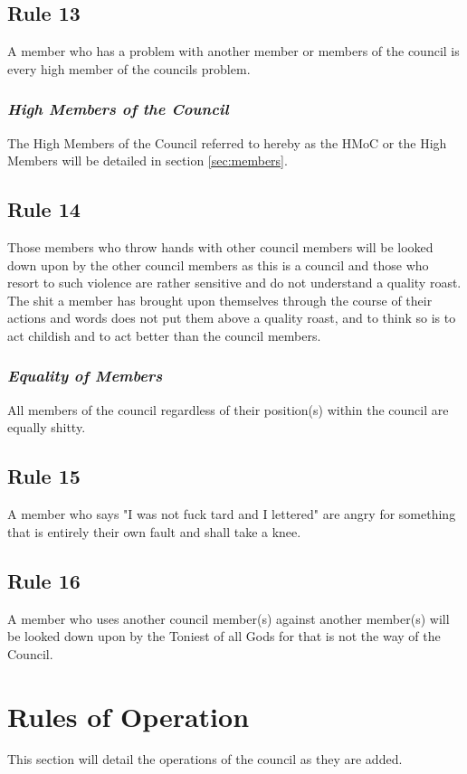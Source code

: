 \documentclass[letterpaper]{article}
\begin{document}
\subsection{Rule 13}
A member who has a problem with another member or members of the council is every high member of the councils problem.
\subsubsection{\textit{High Members of the Council}}
The High Members of the Council referred to hereby as the HMoC or the High Members will be detailed in section \ref{sec:members}.

\subsection{Rule 14}
Those members who throw hands with other council members will be looked down upon by the other council members as this is a council and those who resort to such violence are rather sensitive and do not understand a quality roast. The shit a member has brought upon themselves through the course of their actions and words does not put them above a quality roast, and to think so is to act childish and to act better than the council members.
\subsubsection{\textit{Equality of Members}}
All members of the council regardless of their position(s) within the council are equally shitty. 

\subsection{Rule 15}
A member who says "I was not fuck tard and I lettered" are angry for something that is entirely their own fault and shall take a knee.

\subsection{Rule 16}
A member who uses another council member(s) against another member(s) will be looked down upon by the Toniest of all Gods for that is not the way of the Council.

\newpage
\section{Rules of Operation}
\label{sec:rulesOperation}
This section will detail the operations of the council as they are added.
\end{document}
